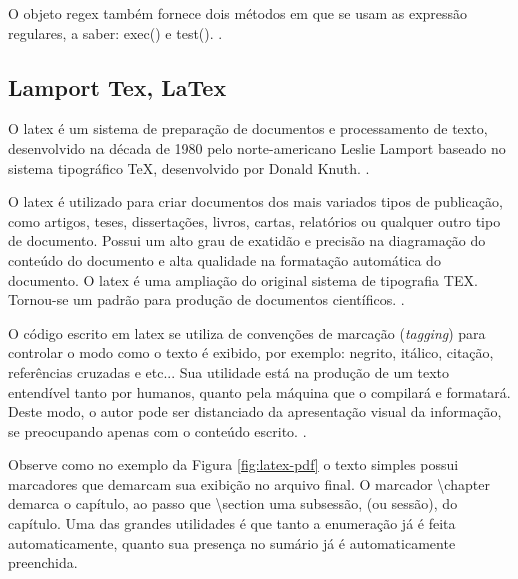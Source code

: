 O objeto
\acrshort{regex}
também fornece dois métodos em que se usam as expressão regulares,
a saber: exec() e test().
\cite{mdn-regex}.

\subsection{Lamport Tex, LaTex}

O
\acrshort{latex}
é um sistema de preparação de documentos e processamento de texto,
desenvolvido na década de 1980 pelo norte-americano Leslie Lamport baseado
no sistema tipográfico TeX, desenvolvido por Donald Knuth.
\cite{latex-2}.

\vspace{15mm}
    \noindent
    \begin{minipage}{\textwidth}
        \noindent
        \begin{minipage}{4cm}
        \end{minipage}%
        \hfill
        \begin{minipage}{\dimexpr\textwidth-4cm}
            \hspace*{\parindent}
            \fontsize{10pt}{12pt}\selectfont %
            O
\acrshort{latex}
é utilizado para criar documentos dos mais variados tipos de
publicação, como artigos, teses, dissertações, livros, cartas, relatórios ou qualquer
outro tipo de documento. Possui um alto grau de exatidão e precisão na diagramação do
conteúdo do documento e alta qualidade na formatação automática do documento. O
\acrshort{latex}
é uma ampliação do original sistema de tipografia TEX. Tornou-se um padrão
para produção de documentos científicos.
\cite{tutorial-latex}.
        \end{minipage}
    \end{minipage}
    \vspace{15mm}

O código escrito em
\acrshort{latex}
se utiliza de convenções de marcação (\textit{tagging}) para controlar o
modo como o texto é exibido, por exemplo: negrito, itálico, citação,
referências cruzadas e etc...
Sua utilidade está na produção de um texto entendível tanto por humanos,
quanto pela máquina que o compilará e formatará. Deste modo, o autor
pode ser distanciado da apresentação visual da informação, se preocupando
apenas com o conteúdo escrito.
\cite{latex-wiki}.

Observe como no exemplo da
Figura \ref{fig:latex-pdf}
o texto simples possui marcadores que demarcam sua exibição
no arquivo final. O marcador \textbackslash chapter demarca o capítulo, ao
passo que \textbackslash section uma subsessão, (ou sessão), do capítulo.
Uma das grandes utilidades é que tanto a enumeração já é feita
automaticamente, quanto sua presença no sumário já é automaticamente
preenchida.

